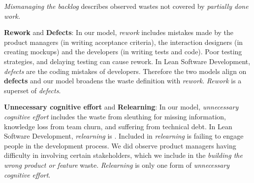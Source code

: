 \textit{Mismanaging the backlog} describes observed wastes not covered by \textit{partially done work.}





\textbf{Rework} and \textbf{Defects}: In our model, \textit{rework} includes mistakes made by the product managers (in writing acceptance criteria), the interaction designers (in creating mockups) and the developers (in writing tests and code). Poor testing strategies, and delaying testing can cause rework. In Lean Software Development, \textit{defects} are the coding mistakes of developers. Therefore the two models align on \textbf{defects} and our model broadens the waste definition with \textit{rework}. \textit{Rework} is a superset of \textit{defects}. 

\textbf{Unnecessary cognitive effort} and \textbf{Relearning}: In our model, \textit{unnecessary cognitive effort} includes the waste from sleuthing for missing information, knowledge loss from team churn, and suffering from technical debt. In Lean Software Development, \textit{relearning} is  \cite{PoppendieckConceptToCash}. Included in \textit{relearning} is failing to engage people in the development process. We did observe product managers having difficulty in involving certain stakeholders, which we include in the \textit{building the wrong product or feature} waste. \textit{Relearning} is only one form of \textit{unnecessary cognitive effort}.

